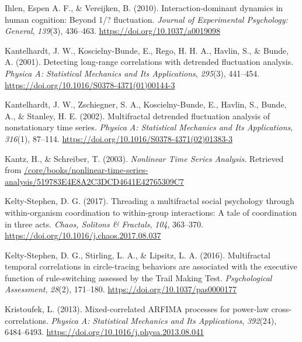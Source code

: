 \documentclass[
  man]{apa6}
\newlength{\cslhangindent}
\newlength{\cslentryspacingunit} %
\newenvironment{CSLReferences}[2] %
 {%
  \setlength{\parindent}{0pt}
  \ifodd #1
  \let\oldpar\par
  \def\par{\hangindent=\cslhangindent\oldpar}
  \fi
  \setlength{\parskip}{#2\cslentryspacingunit}
 }%
 {}
\begin{document}
\begin{CSLReferences}{1}{0}
\leavevmode{}%
Ihlen, Espen A. F., \& Vereijken, B. (2010). Interaction-dominant dynamics in human cognition: Beyond 1/{\textflorin}? fluctuation. \emph{Journal of Experimental Psychology: General}, \emph{139}(3), 436--463. \url{https://doi.org/10.1037/a0019098}

\leavevmode{}%
Kantelhardt, J. W., Koscielny-Bunde, E., Rego, H. H. A., Havlin, S., \& Bunde, A. (2001). Detecting long-range correlations with detrended fluctuation analysis. \emph{Physica A: Statistical Mechanics and Its Applications}, \emph{295}(3), 441--454. \url{https://doi.org/10.1016/S0378-4371(01)00144-3}

\leavevmode{}%
Kantelhardt, J. W., Zschiegner, S. A., Koscielny-Bunde, E., Havlin, S., Bunde, A., \& Stanley, H. E. (2002). Multifractal detrended fluctuation analysis of nonstationary time series. \emph{Physica A: Statistical Mechanics and Its Applications}, \emph{316}(1), 87--114. \url{https://doi.org/10.1016/S0378-4371(02)01383-3}

\leavevmode{}%
Kantz, H., \& Schreiber, T. (2003). \emph{Nonlinear Time Series Analysis}. Retrieved from \href{https:///core/books/nonlinear-time-series-analysis/519783E4E8A2C3DCD4641E42765309C7}{/core/books/nonlinear-time-series-analysis/519783E4E8A2C3DCD4641E42765309C7}

\leavevmode{}%
Kelty-Stephen, D. G. (2017). Threading a multifractal social psychology through within-organism coordination to within-group interactions: {A} tale of coordination in three acts. \emph{Chaos, Solitons \& Fractals}, \emph{104}, 363--370. \url{https://doi.org/10.1016/j.chaos.2017.08.037}

\leavevmode{}%
Kelty-Stephen, D. G., Stirling, L. A., \& Lipsitz, L. A. (2016). Multifractal temporal correlations in circle-tracing behaviors are associated with the executive function of rule-switching assessed by the {Trail} {Making} {Test}. \emph{Psychological Assessment}, \emph{28}(2), 171--180. \url{https://doi.org/10.1037/pas0000177}

\leavevmode{}%
Kristoufek, L. (2013). Mixed-correlated {ARFIMA} processes for power-law cross-correlations. \emph{Physica A: Statistical Mechanics and Its Applications}, \emph{392}(24), 6484--6493. \url{https://doi.org/10.1016/j.physa.2013.08.041}


\end{CSLReferences}
\end{document}

